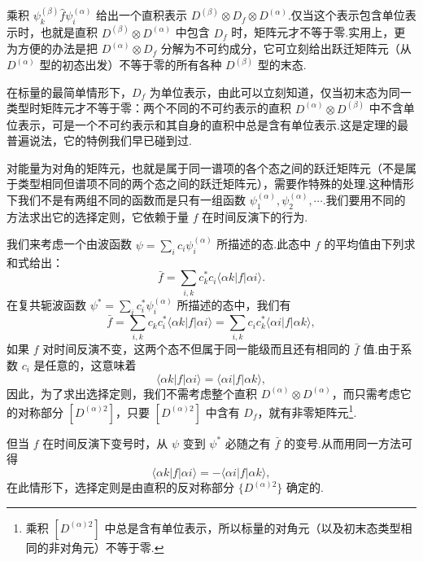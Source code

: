 乘积 $\psi_k^{(\beta)}\hat{f}\psi_i^{(\alpha)}$ 给出一个直积表示 $D^{(\beta)}\otimes D_f\otimes D^{(\alpha)}$.仅当这个表示包含单位表示时，也就是直积 $D^{(\beta)}\otimes D^{(\alpha)}$ 中包含 $D_f$ 时，矩阵元才不等于零.实用上，更为方便的办法是把 $D^{(\alpha)}\otimes D_f$ 分解为不可约成分，它可立刻给出跃迁矩阵元（从 $D^{(\alpha)}$ 型的初态出发）不等于零的所有各种 $D^{(\beta)}$ 型的末态.

在标量的最简单情形下，$D_f$ 为单位表示，由此可以立刻知道，仅当初末态为同一类型时矩阵元才不等于零：两个不同的不可约表示的直积 $D^{(\alpha)}\otimes D^{(\beta)}$ 中不含单位表示，可是一个不可约表示和其自身的直积中总是含有单位表示.这是定理的最普遍说法，它的特例我们早已碰到过.

对能量为对角的矩阵元，也就是属于同一谱项的各个态之间的跃迁矩阵元（不是属于类型相同但谱项不同的两个态之间的跃迁矩阵元），需要作特殊的处理.这种情形下我们不是有两组不同的函数而是只有一组函数 $\psi_1^{(\alpha)},\psi_2^{(\alpha)},\cdots$.我们要用不同的方法求出它的选择定则，它依赖于量 $f$ 在时间反演下的行为.

我们来考虑一个由波函数 $\psi=\sum_i c_i\psi_i^{(\alpha)}$ 所描述的态.此态中 $f$ 的平均值由下列求和式给出：
\begin{equation*}
  \bar{f}=\sum_{i,k}c_k^{*}c_i\langle\alpha k|f|\alpha i\rangle.
\end{equation*}
在复共轭波函数 $\psi^{*}=\sum_i c_i^{*}\psi_i^{(\alpha)}$ 所描述的态中，我们有
\begin{equation*}
  \bar{f}=\sum_{i,k}c_k c_i^{*}\langle\alpha k|f|\alpha i\rangle
  =\sum_{i,k}c_i c_k^{*}\langle\alpha i|f|\alpha k\rangle,
\end{equation*}
如果 $f$ 对时间反演不变，这两个态不但属于同一能级而且还有相同的 $\bar{f}$ 值.由于系数 $c_i$ 是任意的，这意味着
\begin{equation*}
  \langle\alpha k|f|\alpha i\rangle=\langle\alpha i|f|\alpha k\rangle,
\end{equation*}
因此，为了求出选择定则，我们不需考虑整个直积 $D^{(\alpha)}\otimes D^{(\alpha)}$，而只需考虑它的对称部分 $[D^{(\alpha)2}]$，只要 $[D^{(\alpha)2}]$ 中含有 $D_f$，就有非零矩阵元\footnote{乘积 $[D^{(\alpha)2}]$ 中总是含有单位表示，所以标量的对角元（以及初末态类型相同的非对角元）不等于零.}.

但当 $f$ 在时间反演下变号时，从 $\psi$ 变到 $\psi^{*}$ 必随之有 $\bar{f}$ 的变号.从而用同一方法可得
\begin{equation*}
  \langle\alpha k|f|\alpha i\rangle=-\langle\alpha i|f|\alpha k\rangle,
\end{equation*}
在此情形下，选择定则是由直积的反对称部分 $\{D^{(\alpha)2}\}$ 确定的.

